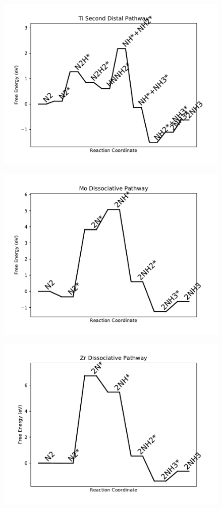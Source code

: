 \begin{figure}
\includegraphics[width=0.8\linewidth]{data/plots/Ti_distal_2.pdf}
\end{figure}

\begin{figure}
\includegraphics[width=0.8\linewidth]{data/plots/Mo_dissociative.pdf}
\end{figure}

\begin{figure}
\includegraphics[width=0.8\linewidth]{data/plots/Zr_dissociative.pdf}
\end{figure}

